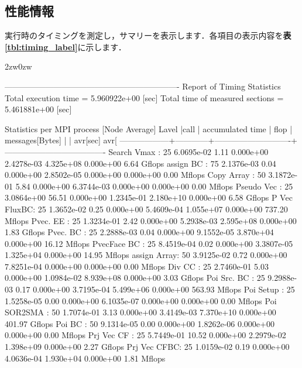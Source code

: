 %
\pagebreak
\hypertarget{tgt:profile}{\subsection{性能情報}}
実行時のタイミングを測定し，サマリーを表示します．各項目の表示内容を\textbf{表\ref{tbl:timing_label}}に示します．

\begin{indentation}{2zw}{0zw}
{\small 
\begin{program}
----------------------------------------------------------------
Report of Timing Statistics
Total execution time            = 5.960922e+00 [sec]
Total time of measured sections = 5.461881e+00 [sec]

Statistics per MPI process [Node Average]
Lavel       |call |             accumulated time            |       flop | messages[Bytes]
            |     |   avr[sec]  avr[%
------------------+------------+----------------------------+-------------------------------------
Search Vmax :  25   6.0695e-02   1.11  0.000e+00  2.4278e-03   4.325e+08  0.000e+00    6.64 Gflops
assign BC   :  75   2.1376e-03   0.04  0.000e+00  2.8502e-05   0.000e+00  0.000e+00    0.00 Mflops
Copy Array  :  50   3.1872e-01   5.84  0.000e+00  6.3744e-03   0.000e+00  0.000e+00    0.00 Mflops
Pseudo Vec  :  25   3.0864e+00  56.51  0.000e+00  1.2345e-01   2.180e+10  0.000e+00    6.58 Gflops
P Vec FluxBC:  25   1.3652e-02   0.25  0.000e+00  5.4609e-04   1.055e+07  0.000e+00  737.20 Mflops
Pvec. EE    :  25   1.3234e-01   2.42  0.000e+00  5.2938e-03   2.595e+08  0.000e+00    1.83 Gflops
Pvec. BC    :  25   2.2888e-03   0.04  0.000e+00  9.1552e-05   3.870e+04  0.000e+00   16.12 Mflops
PvecFace BC :  25   8.4519e-04   0.02  0.000e+00  3.3807e-05   1.325e+04  0.000e+00   14.95 Mflops
assign Array:  50   3.9125e-02   0.72  0.000e+00  7.8251e-04   0.000e+00  0.000e+00    0.00 Mflops
Div CC      :  25   2.7460e-01   5.03  0.000e+00  1.0984e-02   8.939e+08  0.000e+00    3.03 Gflops
Poi Src. BC :  25   9.2988e-03   0.17  0.000e+00  3.7195e-04   5.499e+06  0.000e+00  563.93 Mflops
Poi Setup   :  25   1.5258e-05   0.00  0.000e+00  6.1035e-07   0.000e+00  0.000e+00    0.00 Mflops
Poi SOR2SMA :  50   1.7074e-01   3.13  0.000e+00  3.4149e-03   7.370e+10  0.000e+00  401.97 Gflops
Poi BC      :  50   9.1314e-05   0.00  0.000e+00  1.8262e-06   0.000e+00  0.000e+00    0.00 Mflops
Prj Vec CF  :  25   5.7449e-01  10.52  0.000e+00  2.2979e-02   1.398e+09  0.000e+00    2.27 Gflops
Prj Vec CFBC:  25   1.0159e-02   0.19  0.000e+00  4.0636e-04   1.930e+04  0.000e+00    1.81 Mflops

\end{program}}
\end{indentation}
